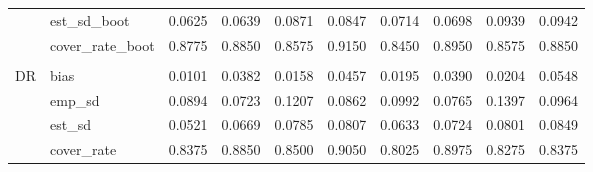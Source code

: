 \documentclass[11pt]{article}
\numberwithin{equation}{section}
\begin{document}
\begin{table}[]
{\begin{tabular}{llcccccccc}
			& est\_sd\_boot & 0.0625 & 0.0639 & 0.0871 & 0.0847 & 0.0714 & 0.0698 & 0.0939 & 0.0942 \\
			& cover\_rate\_boot & 0.8775 & 0.8850 & 0.8575 & 0.9150 & 0.8450 & 0.8950 & 0.8575 & 0.8850 \\
			\\
			\multirow{6}{*}{DR}  & bias & 0.0101 & 0.0382 & 0.0158 & 0.0457 & 0.0195 & 0.0390 & 0.0204 & 0.0548 \\
			& emp\_sd & 0.0894 & 0.0723 & 0.1207 & 0.0862 & 0.0992 & 0.0765 & 0.1397 & 0.0964 \\
			& est\_sd & 0.0521 & 0.0669 & 0.0785 & 0.0807 & 0.0633 & 0.0724 & 0.0801 & 0.0849 \\
			& cover\_rate & 0.8375 & 0.8850 & 0.8500 & 0.9050 & 0.8025 & 0.8975 & 0.8275 & 0.8375 \\
			\hline
		\end{tabular}
		\label{tab:simu_average_p100}
	}
\end{table}
\end{document}
